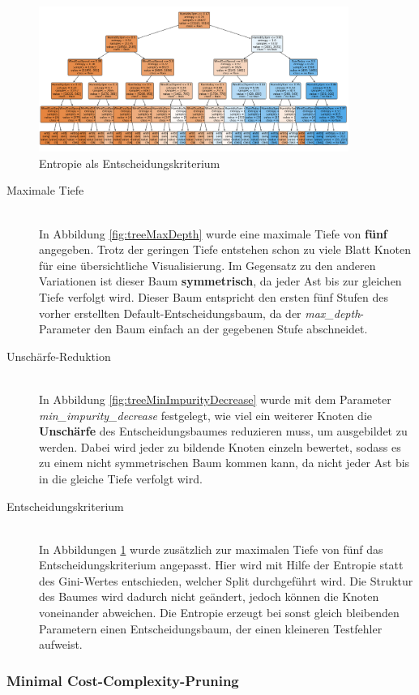 \begin{figure}[H]
\begin{minipage}{0.30\textwidth}
    \end{minipage}\hfill
    \begin{minipage}{0.30\textwidth}
        \centering
        \includegraphics[width=0.9\textwidth]{Bilder/treeCriterion} %
        \caption{Entropie als Entscheidungskriterium}
        \label{fig:treeCriterion}
    \end{minipage}
\end{figure}
\begin{description}
	\item[Maximale Tiefe]\hfill \\
	In Abbildung \ref{fig:treeMaxDepth} wurde eine maximale Tiefe von \textbf{fünf} angegeben. Trotz der geringen Tiefe entstehen schon zu viele Blatt Knoten für eine übersichtliche Visualisierung. Im Gegensatz zu den anderen Variationen ist dieser Baum \textbf{symmetrisch}, da jeder Ast bis zur gleichen Tiefe verfolgt wird. Dieser Baum entspricht den ersten fünf Stufen des vorher erstellten Default-Entscheidungsbaum, da der \emph{max\_depth}-Parameter den Baum einfach an der gegebenen Stufe abschneidet.
	\item[Unschärfe-Reduktion]\hfill \\ 
	In Abbildung \ref{fig:treeMinImpurityDecrease} wurde mit dem Parameter \emph{min\_impurity\_decrease} festgelegt, wie viel ein weiterer Knoten die \textbf{Unschärfe} des Entscheidungsbaumes reduzieren muss, um ausgebildet zu werden. Dabei wird jeder zu bildende Knoten einzeln bewertet, sodass es zu einem nicht symmetrischen Baum kommen kann, da nicht jeder Ast bis in die gleiche Tiefe verfolgt wird.
	\item[Entscheidungskriterium]\hfill \\ 
	In Abbildungen \ref{fig:treeCriterion} wurde zusätzlich zur maximalen Tiefe von fünf das Entscheidungskriterium angepasst. Hier wird mit Hilfe der Entropie statt des Gini-Wertes entschieden, welcher Split durchgeführt wird. Die Struktur des Baumes wird dadurch nicht geändert, jedoch können die Knoten voneinander abweichen. Die Entropie erzeugt bei sonst gleich bleibenden Parametern einen Entscheidungsbaum, der einen kleineren Testfehler aufweist.
\end{description}
\subsubsection{Minimal Cost-Complexity-Pruning}



